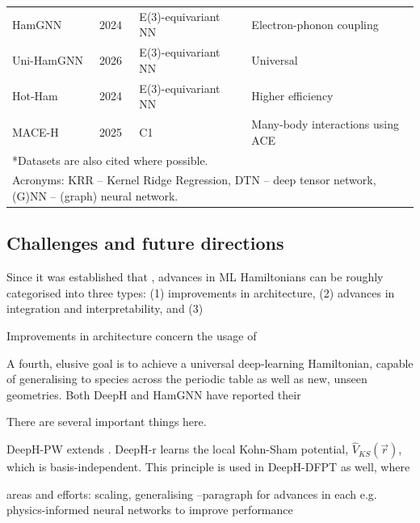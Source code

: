 \documentclass[11pt,a4paper,twoside]{report}  %
\numberwithin{equation}{section}					%
\numberwithin{figure}{section}						%
\newcommand{\red}[1]{{\color{red}#1}}
\begin{document}
\begin{table}
\begin{tabular}{lllp{8cm}}
       HamGNN\autocite{zhongAcceleratingCalculationElectron2024} & 2024 & E(3)-equivariant NN & Electron-phonon coupling \\
       
       Uni-HamGNN\autocites{zhongUniversalSpinOrbit2026} & 2026 & E(3)-equivariant NN & Universal \\%
            \midrule      
        Hot-Ham\autocite{HotHamAccurateEfficient} & 2024 & E(3)-equivariant NN & Higher efficiency \\
        \midrule
       MACE-H & 2025 & C1 & Many-body interactions using ACE \\       %
        \bottomrule    
        \multicolumn{4}{l}{*Datasets are also cited where possible.}
        \\
        \multicolumn{4}{l}{Acronyms: KRR -- Kernel Ridge Regression, DTN -- deep tensor network, (G)NN -- (graph) neural network.}
    \end{tabular}
    \label{tab:example}         %
\end{table}


\subsection{Challenges and future directions}

Since it was established that , advances in ML Hamiltonians can be roughly categorised into three types: (1) improvements in architecture, (2) advances in integration and interpretability, and (3) 

Improvements in architecture concern the usage of 




A fourth, elusive goal is to achieve a universal deep-learning Hamiltonian, capable of generalising to species across the periodic table as well as new, unseen geometries. Both DeepH and HamGNN have reported their 


There are several important things here. 



DeepH-PW extends . DeepH-r learns the local Kohn-Sham potential, $\hat V_{KS}(\vec r)$, which is basis-independent. This principle is used in DeepH-DFPT as well, where 

\red{areas and efforts: scaling, generalising --paragraph for advances in each e.g. physics-informed neural networks to improve performance}
\end{document}
